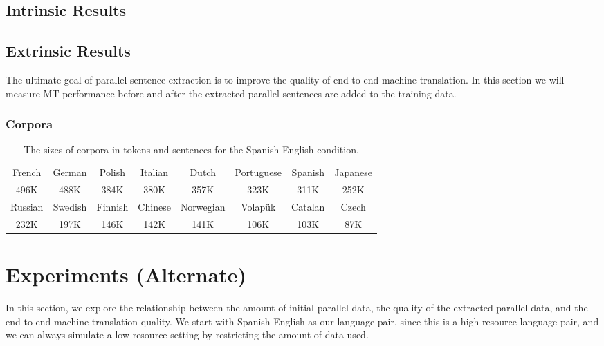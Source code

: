 \subsection{Intrinsic Results}

\subsection{Extrinsic Results}
The ultimate goal of parallel sentence extraction is to improve the quality of
end-to-end machine translation. In this section we will measure MT performance
before and after the extracted parallel sentences are added to the training
data.

\subsubsection{Corpora}
\begin{table}
\small
\begin{center}
\begin{tabular}{|c|c|c|c|c|c|c|c|}
\hline
French & German & Polish & Italian & Dutch & Portuguese & Spanish & Japanese \\
496K & 488K & 384K & 380K & 357K & 323K & 311K & 252K\\
\hline
Russian & Swedish & Finnish & Chinese & Norwegian & Volap\"{u}k & Catalan & Czech \\
232K & 197K & 146K & 142K & 141K & 106K & 103K & 87K\\
\hline
\end{tabular}
\end{center}
\caption{The sizes of corpora in tokens and sentences for the Spanish-English
condition.}
\label{table:esen_corpora}
\end{table}

\section{Experiments (Alternate)}
\label{sec:experiments_all}
In this section, we explore the relationship between the amount of initial
parallel data, the quality of the extracted parallel data, and the end-to-end
machine translation quality. We start with Spanish-English as our language pair,
since this is a high resource language pair, and we can always simulate a low
resource setting by restricting the amount of data used.

